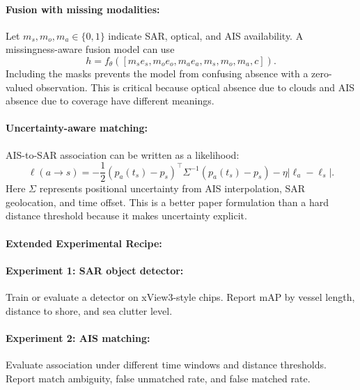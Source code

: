 \documentclass{article}
\begin{document}
\paragraph{Fusion with missing modalities:}

Let $m_s,m_o,m_a\in\{0,1\}$ indicate SAR, optical, and AIS availability. A missingness-aware fusion model can use
\begin{equation}
  h=f_{\theta}([m_s e_s,m_o e_o,m_a e_a,m_s,m_o,m_a,c]).
\end{equation}
Including the masks prevents the model from confusing absence with a zero-valued observation. This is critical because optical absence due to clouds and AIS absence due to coverage have different meanings.

\paragraph{Uncertainty-aware matching:}

AIS-to-SAR association can be written as a likelihood:
\begin{equation}
  \ell(a\rightarrow s)=
  -\frac{1}{2}(p_a(t_s)-p_s)^\top\Sigma^{-1}(p_a(t_s)-p_s)
  -\eta|\ell_a-\ell_s|.
\end{equation}
Here $\Sigma$ represents positional uncertainty from AIS interpolation, SAR geolocation, and time offset. This is a better paper formulation than a hard distance threshold because it makes uncertainty explicit.

\paragraph{Extended Experimental Recipe:}

\paragraph{Experiment 1: SAR object detector:}

Train or evaluate a detector on xView3-style chips. Report mAP by vessel length, distance to shore, and sea clutter level.

\paragraph{Experiment 2: AIS matching:}

Evaluate association under different time windows and distance thresholds. Report match ambiguity, false unmatched rate, and false matched rate.
\end{document}
